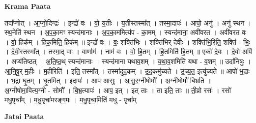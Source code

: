 \documentclass[17pt]{extarticle}
\begin{document}
\textbf{Krama Paata} \newline

तदा᳚प्नोत् । आ॒प्नो॒दिन्द्रः॑ । इन्द्रो॑ वः । वो॒ य॒तीः । य॒तीस्तस्मा᳚त् । तस्मा॒दापः॑ । आपो॒ अनु॑ । अनु॑ स्थन । स्थ॒नेति॑ स्थन ॥ अ॒प॒का॒मꣳ स्यन्द॑मानाः । अ॒प॒का॒ममित्य॑प - का॒मम् । स्यन्द॑माना॒ अवी॑वरत । अवी॑वरत वः । वो॒ हिक᳚म् । हिक॒मिति॒ हिक᳚म् ॥ इन्द्रो॑ वः । वः॒ शक्ति॑भिः । शक्ति॑भिर् देवीः । शक्ति॑भि॒रिति॒ शक्ति॑ - भिः॒ । दे॒वी॒स्तस्मा᳚त् । तस्मा॒द् वाः । वार्णाम॑ । नाम॑ वः । वो॒ हि॒तम् । हि॒तमिति॑ हि॒तम् ॥ एको॑ दे॒वः । दे॒वो अपि॑ । अप्य॑तिष्ठत् । अ॒ति॒ष्ठ॒थ् स्यन्द॑मानाः । स्यन्द॑माना यथाव॒शम् । य॒था॒व॒शमिति॑ यथा - व॒शम् ॥ उदा॑निषुः । आ॒नि॒षु॒र् म॒हीः । म॒हीरिति॑ । इति॒ तस्मा᳚त् । तस्मा॑दुद॒कम् । उ॒द॒कमु॑च्यते । उ॒च्य॒त॒ इत्यु॑च्यते ॥ आपो॑ भ॒द्राः । भ॒द्रा घृ॒तम् । घृ॒तमित् । इदापः॑ । आप॑ आसुः । आ॒सु॒र॒ग्नीषोमौ᳚ । अ॒ग्नीषोमौ॑ बिभ्रति । अ॒ग्नीषोमा॒वित्य॒ग्नी - सोमौ᳚ । बि॒भ्र॒त्यापः॑ । आप॒ इत् । इत् ताः । ता इति॒ ताः ॥ ती॒व्रो रसः॑ । रसो॑ मधु॒पृचा᳚म् । म॒धु॒पृचा॑मरङ्ग॒मः । म॒धु॒पृचा॒मिति॑ मधु - पृचा᳚म् \newline

\textbf{Jatai Paata} \newline
\end{document}
